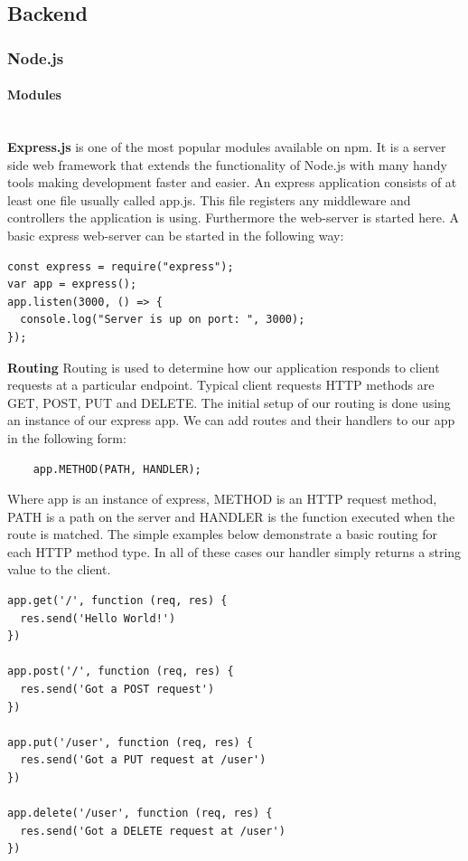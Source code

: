 \documentclass[11pt]{article}
\newcommand{\myparagraph}[1]{\paragraph{#1}\mbox{}\\}
\begin{document}
\subsection{Backend} 

\subsubsection{Node.js}

\myparagraph{Modules}  



\textbf{Express.js}  is one of the most popular modules available on npm. It is a server side web framework that extends the functionality of Node.js with many handy tools making development faster and easier. An express application consists of at least one file usually called app.js. This file registers any middleware and controllers the application is using. Furthermore the web-server is started here. A basic express web-server can be started in the following way:  

\begin{lstlisting}
const express = require("express");
var app = express();
app.listen(3000, () => {
  console.log("Server is up on port: ", 3000); 
});  
\end{lstlisting}    



\textbf{Routing} 
Routing is used to determine how our application responds to client requests at a particular endpoint.  
Typical client requests HTTP methods are GET, POST, PUT and DELETE. The initial setup of our routing is done using an instance of our express app. We can add routes and their handlers to our app in the following form:

\begin{lstlisting}
	app.METHOD(PATH, HANDLER); 
\end{lstlisting}

Where app is an instance of express, METHOD is an HTTP request method, PATH is a path on the server and HANDLER is the function executed when the route is matched. The simple examples below demonstrate a basic routing for each HTTP method type. In all of these cases our handler simply returns a string value to the client.   

\begin{lstlisting}
app.get('/', function (req, res) {
  res.send('Hello World!')
})

app.post('/', function (req, res) {
  res.send('Got a POST request')
})

app.put('/user', function (req, res) {
  res.send('Got a PUT request at /user')
})

app.delete('/user', function (req, res) {
  res.send('Got a DELETE request at /user')
})

\end{lstlisting}
\end{document}
